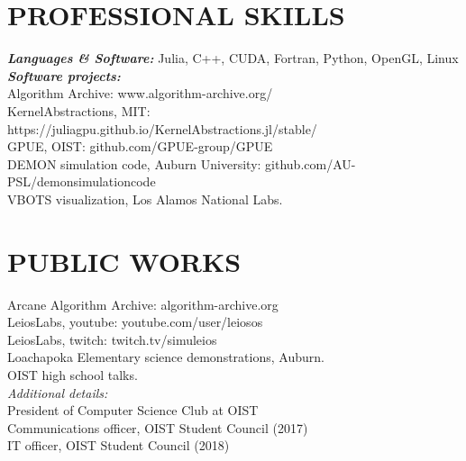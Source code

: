 \documentclass[margin, 10pt, a4paper]{res} %
\begin{document}
\begin{resume}
\newpage

\section{PROFESSIONAL SKILLS} 

{\sl \textbf{Languages \& Software:}} 
Julia, C++, CUDA, Fortran, Python, OpenGL, Linux  \\

{\sl \textbf{Software projects:}} \\
Algorithm Archive: www.algorithm-archive.org/ \\
KernelAbstractions, MIT: https://juliagpu.github.io/KernelAbstractions.jl/stable/\\
GPUE, OIST: github.com/GPUE-group/GPUE \\
DEMON simulation code, Auburn University: github.com/AU-PSL/demonsimulationcode \\
VBOTS visualization, Los Alamos National Labs. \\

\section{PUBLIC WORKS}

Arcane Algorithm Archive: algorithm-archive.org \\
LeiosLabs, youtube: youtube.com/user/leiosos \\
LeiosLabs, twitch: twitch.tv/simuleios \\
Loachapoka Elementary science demonstrations, Auburn. \\
OIST high school talks.\\

{\sl Additional details:} \\
President of Computer Science Club at OIST \\
Communications officer, OIST Student Council (2017) \\
IT officer, OIST Student Council (2018)




\end{resume}
\end{document}
